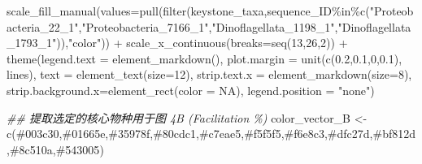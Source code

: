 \documentclass[
  letterpaper,
  DIV=11,
  numbers=noendperiod]{scrreprt}
\newenvironment{Shaded}{\begin{snugshade}}{\end{snugshade}}
\newcommand{\AttributeTok}[1]{\textcolor[rgb]{0.40,0.45,0.13}{#1}}
\newcommand{\ConstantTok}[1]{\textcolor[rgb]{0.56,0.35,0.01}{#1}}
\newcommand{\DecValTok}[1]{\textcolor[rgb]{0.68,0.00,0.00}{#1}}
\newcommand{\DocumentationTok}[1]{\textcolor[rgb]{0.37,0.37,0.37}{\textit{#1}}}
\newcommand{\FloatTok}[1]{\textcolor[rgb]{0.68,0.00,0.00}{#1}}
\newcommand{\FunctionTok}[1]{\textcolor[rgb]{0.28,0.35,0.67}{#1}}
\newcommand{\NormalTok}[1]{\textcolor[rgb]{0.00,0.23,0.31}{#1}}
\newcommand{\OtherTok}[1]{\textcolor[rgb]{0.00,0.23,0.31}{#1}}
\newcommand{\SpecialCharTok}[1]{\textcolor[rgb]{0.37,0.37,0.37}{#1}}
\newcommand{\StringTok}[1]{\textcolor[rgb]{0.13,0.47,0.30}{#1}}
\begin{document}
\begin{Shaded}
\begin{Highlighting}[]
  \FunctionTok{scale\_fill\_manual}\NormalTok{(}\AttributeTok{values=}\FunctionTok{pull}\NormalTok{(}\FunctionTok{filter}\NormalTok{(keystone\_taxa,sequence\_ID}\SpecialCharTok{\%in\%}\FunctionTok{c}\NormalTok{(}\StringTok{"Proteobacteria\_22\_1"}\NormalTok{,}\StringTok{"Proteobacteria\_7166\_1"}\NormalTok{,}\StringTok{"Dinoflagellata\_1198\_1"}\NormalTok{,}\StringTok{"Dinoflagellata\_1793\_1"}\NormalTok{)),}\StringTok{"color"}\NormalTok{)) }\SpecialCharTok{+}
  \FunctionTok{scale\_x\_continuous}\NormalTok{(}\AttributeTok{breaks=}\FunctionTok{seq}\NormalTok{(}\DecValTok{13}\NormalTok{,}\DecValTok{26}\NormalTok{,}\DecValTok{2}\NormalTok{)) }\SpecialCharTok{+}
  \FunctionTok{theme}\NormalTok{(}\AttributeTok{legend.text =} \FunctionTok{element\_markdown}\NormalTok{(),}
        \AttributeTok{plot.margin =} \FunctionTok{unit}\NormalTok{(}\FunctionTok{c}\NormalTok{(}\FloatTok{0.2}\NormalTok{,}\FloatTok{0.1}\NormalTok{,}\DecValTok{0}\NormalTok{,}\FloatTok{0.1}\NormalTok{), }\StringTok{\textquotesingle{}lines\textquotesingle{}}\NormalTok{),}
        \AttributeTok{text =} \FunctionTok{element\_text}\NormalTok{(}\AttributeTok{size=}\DecValTok{12}\NormalTok{),}
        \AttributeTok{strip.text.x =} \FunctionTok{element\_markdown}\NormalTok{(}\AttributeTok{size=}\DecValTok{8}\NormalTok{),}
        \AttributeTok{strip.background.x=}\FunctionTok{element\_rect}\NormalTok{(}\AttributeTok{color =} \ConstantTok{NA}\NormalTok{),}
        \AttributeTok{legend.position =} \StringTok{"none"}\NormalTok{)}

\DocumentationTok{\#\# 提取选定的核心物种用于图 4B (Facilitation \%)}
\NormalTok{color\_vector\_B }\OtherTok{\textless{}{-}} \FunctionTok{c}\NormalTok{(}\StringTok{\textquotesingle{}\#003c30\textquotesingle{}}\NormalTok{,}\StringTok{\textquotesingle{}\#01665e\textquotesingle{}}\NormalTok{,}\StringTok{\textquotesingle{}\#35978f\textquotesingle{}}\NormalTok{,}\StringTok{\textquotesingle{}\#80cdc1\textquotesingle{}}\NormalTok{,}\StringTok{\textquotesingle{}\#c7eae5\textquotesingle{}}\NormalTok{,}\StringTok{\textquotesingle{}\#f5f5f5\textquotesingle{}}\NormalTok{,}\StringTok{\textquotesingle{}\#f6e8c3\textquotesingle{}}\NormalTok{,}\StringTok{\textquotesingle{}\#dfc27d\textquotesingle{}}\NormalTok{,}\StringTok{\textquotesingle{}\#bf812d\textquotesingle{}}\NormalTok{,}\StringTok{\textquotesingle{}\#8c510a\textquotesingle{}}\NormalTok{,}\StringTok{\textquotesingle{}\#543005\textquotesingle{}}\NormalTok{)}


\end{Highlighting}
\end{Shaded}
\end{document}
